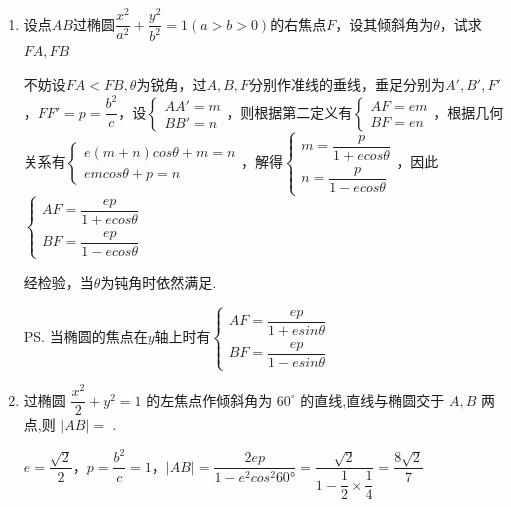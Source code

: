 \begin{enumerate}
    \item 设点$AB$过椭圆$\dfrac{x^2}{a^2}+\dfrac{y^2}{b^2} = 1(a>b>0)$的右焦点$F$，设其倾斜角为$\theta$，试求$FA, FB$
    \begin{jieda}
        不妨设$FA < FB, \theta $为锐角，过$A,B,F$分别作准线的垂线，垂足分别为$A', B', F'$，$FF' = p = \dfrac{b^2}{c}$，设$\left\{\begin{array}{l}
             AA' = m  \\
             BB' = n 
        \end{array}\right.$，则根据第二定义有$\left\{\begin{array}{l}
             AF = em \\
             BF = en
        \end{array}\right.$，根据几何关系有$\left\{\begin{array}{l}
             e(m+n)cos\theta + m = n\\
             emcos\theta + p = n
        \end{array}\right.$，解得$\left\{\begin{array}{l}
             m = \dfrac{p}{1+ecos\theta}\\
             n = \dfrac{p}{1-ecos\theta}
        \end{array}\right.$，因此$\left\{\begin{array}{l}
             AF = \dfrac{ep}{1+ecos\theta}\\
             BF = \dfrac{ep}{1-ecos\theta}
        \end{array}\right.$
        
        经检验，当$\theta$为钝角时依然满足.
    
        \ps 当椭圆的焦点在$y$轴上时有$\left\{\begin{array}{l}
                 AF = \dfrac{ep}{1+esin\theta}\\
                 BF = \dfrac{ep}{1-esin\theta}
            \end{array}\right.$
    \end{jieda}
    

    
    \item 过椭圆 $\dfrac{{x}^{2}}{2} + {y}^{2} = 1$ 的左焦点作倾斜角为 ${60}^{ \circ  }$ 的直线,直线与椭圆交于 $A,B$ 两点,则 $\left| {AB}\right|  =$ .
    \begin{jieda}
        $e = \dfrac{\sqrt{2}}{2}$，$p = \dfrac{b^2}{c} = 1$，$|AB| = \dfrac{2ep}{1-e^2cos^2\ang{60}} = \dfrac{\sqrt{2}}{1 - \dfrac{1}{2} \times \dfrac{1}{4}} = \dfrac{8\sqrt{2}}{7}$
    \end{jieda}
    

\end{enumerate}
